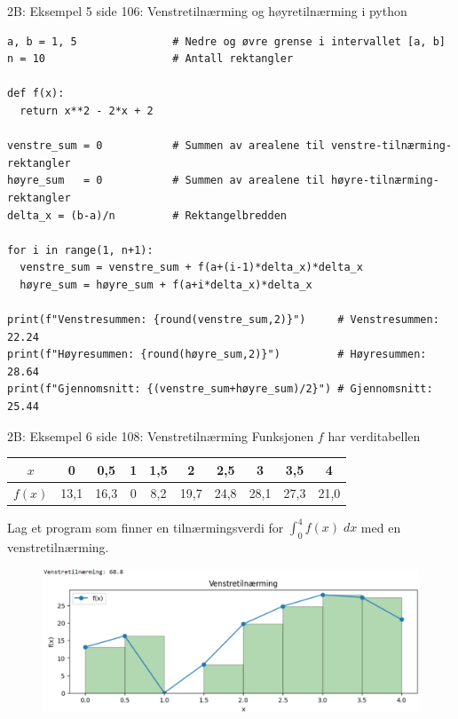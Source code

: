 \greenheader
\begin{frame}[fragile]{2B: Eksempel 5 side 106: Venstretilnærming og høyretilnærming i python}
\begin{verbatim}
a, b = 1, 5               # Nedre og øvre grense i intervallet [a, b]
n = 10                    # Antall rektangler

def f(x):
  return x**2 - 2*x + 2

venstre_sum = 0           # Summen av arealene til venstre-tilnærming-rektangler
høyre_sum   = 0           # Summen av arealene til høyre-tilnærming-rektangler
delta_x = (b-a)/n         # Rektangelbredden

for i in range(1, n+1):
  venstre_sum = venstre_sum + f(a+(i-1)*delta_x)*delta_x
  høyre_sum = høyre_sum + f(a+i*delta_x)*delta_x

print(f"Venstresummen: {round(venstre_sum,2)}")     # Venstresummen: 22.24
print(f"Høyresummen: {round(høyre_sum,2)}")         # Høyresummen: 28.64
print(f"Gjennomsnitt: {(venstre_sum+høyre_sum)/2}") # Gjennomsnitt: 25.44
\end{verbatim}
\end{frame}

\greenheader
\begin{frame}{2B: Eksempel 6 side 108: Venstretilnærming}
Funksjonen $f$ har verditabellen
\begin{table}[h]
\centering
\begin{tabular}{c|ccccccccc}
$x$ & 0 & 0,5 & 1 & 1,5 & 2 & 2,5 & 3 & 3,5 & 4 \\
\hline
$f(x)$ & 13,1 & 16,3 & 0 & 8,2 & 19,7 & 24,8 & 28,1 & 27,3 & 21,0 \\
\end{tabular}
\end{table}
Lag et program som finner en tilnærmingsverdi for $\int_0^4 f(x)\;dx$ med en venstretilnærming.
\begin{figure}
    \centering
    \includegraphics[width=0.9\linewidth]{R2-K2B-4.png}

\end{figure}
\end{frame}

